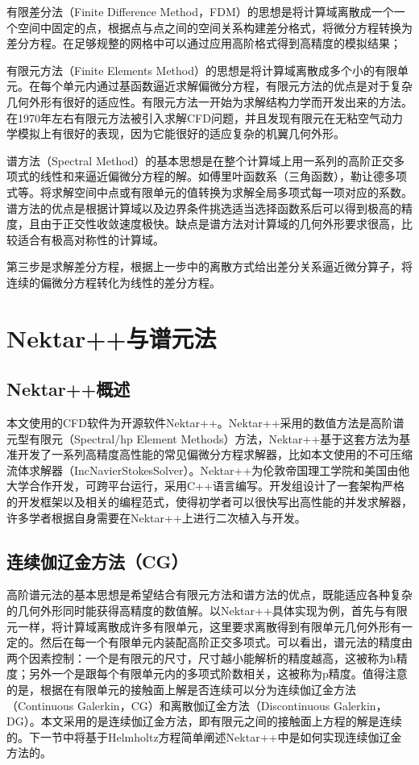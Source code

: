 有限差分法（Finite Difference Method，FDM）的思想是将计算域离散成一个一个空间中固定的点，根据点与点之间的空间关系构建差分格式，将微分方程转换为差分方程。在足够规整的网格中可以通过应用高阶格式得到高精度的模拟结果；

有限元方法（Finite Elements Method）的思想是将计算域离散成多个小的有限单元。在每个单元内通过基函数逼近求解偏微分方程，有限元方法的优点是对于复杂几何外形有很好的适应性。有限元方法一开始为求解结构力学而开发出来的方法。在1970年左右有限元方法被引入求解CFD问题，并且发现有限元在无粘空气动力学模拟上有很好的表现，因为它能很好的适应复杂的机翼几何外形。

谱方法（Spectral Method）的基本思想是在整个计算域上用一系列的高阶正交多项式的线性和来逼近偏微分方程的解。如傅里叶函数系（三角函数），勒让德多项式等。将求解空间中点或有限单元的值转换为求解全局多项式每一项对应的系数。谱方法的优点是根据计算域以及边界条件挑选适当选择函数系后可以得到极高的精度，且由于正交性收敛速度极快。缺点是谱方法对计算域的几何外形要求很高，比较适合有极高对称性的计算域。\cite{spectralhp,spectral1984}

第三步是求解差分方程，根据上一步中的离散方式给出差分关系逼近微分算子，将连续的偏微分方程转化为线性的差分方程。

\section{Nektar++与谱元法}
\subsection{Nektar++概述}
本文使用的CFD软件为开源软件Nektar++。Nektar++采用的数值方法是高阶谱元型有限元（Spectral/hp Element Methods）方法，Nektar++基于这套方法为基准开发了一系列高精度高性能的常见偏微分方程求解器，比如本文使用的不可压缩流体求解器（IncNavierStokesSolver）。Nektar++为伦敦帝国理工学院和美国由他大学合作开发，可跨平台运行，采用C++语言编写。开发组设计了一套架构严格的开发框架以及相关的编程范式，使得初学者可以很快写出高性能的并发求解器，许多学者根据自身需要在Nektar++上进行二次植入与开发。

\subsection{连续伽辽金方法（CG）}
高阶谱元法的基本思想是希望结合有限元方法和谱方法的优点，既能适应各种复杂的几何外形同时能获得高精度的数值解。以Nektar++具体实现为例，首先与有限元一样，将计算域离散成许多有限单元，这里要求离散得到有限单元几何外形有一定的。然后在每一个有限单元内装配高阶正交多项式。可以看出，谱元法的精度由两个因素控制：一个是有限元的尺寸，尺寸越小能解析的精度越高，这被称为h精度；另外一个是跟每个有限单元内的多项式阶数相关，这被称为p精度。值得注意的是，根据在有限单元的接触面上解是否连续可以分为连续伽辽金方法（Continuous Galerkin，CG）和离散伽辽金方法（Discontinuous Galerkin，DG）。本文采用的是连续伽辽金方法，即有限元之间的接触面上方程的解是连续的。下一节中将基于Helmholtz方程简单阐述Nektar++中是如何实现连续伽辽金方法的。

